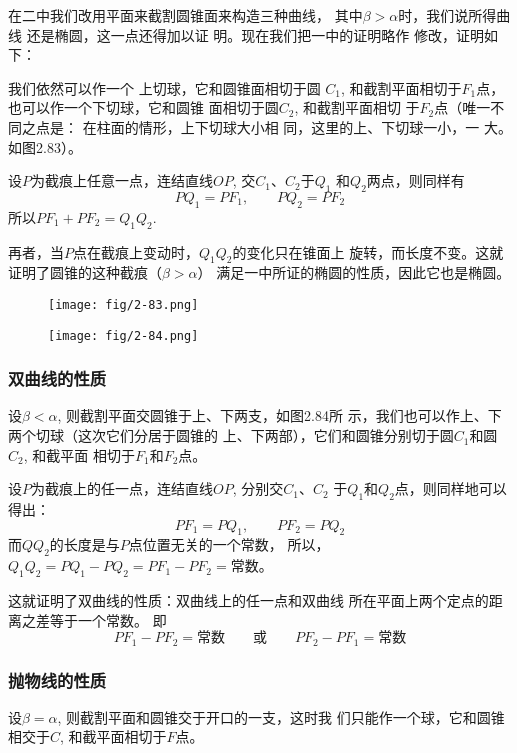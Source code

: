 在二中我们改用平面来截割圆锥面来构造三种曲线，
其中$\beta>\alpha$时，我们说所得曲线
还是椭圆，这一点还得加以证
明。现在我们把一中的证明略作
修改，证明如下：

我们依然可以作一个
上切球，它和圆锥面相切于圆
$C_1$, 和截割平面相切于$F_1$点，
也可以作一个下切球，它和圆锥
面相切于圆$C_2$, 和截割平面相切
于$F_2$点（唯一不同之点是：
在柱面的情形，上下切球大小相
同，这里的上、下切球一小，一
大。如图2.83）。

设$P$为截痕上任意一点，连结直线$OP$, 交$C_1$、$C_2$于$Q_1$
和$Q_2$两点，则同样有
\[PQ_1=PF_1,\qquad PQ_2=PF_2\]
所以$PF_1+PF_2=Q_1Q_2$.

再者，当$P$点在截痕上变动时，$Q_1Q_2$的变化只在锥面上
旋转，而长度不变。这就证明了圆锥的这种截痕（$\beta>\alpha$）
满足一中所证的椭圆的性质，因此它也是椭圆。

\begin{figure}[htp]\centering
    \begin{minipage}[t]{0.48\textwidth}
    \centering
\texttt{[image: fig/2-83.png]}
    \caption{}
    \end{minipage}
    \begin{minipage}[t]{0.48\textwidth}
    \centering
\texttt{[image: fig/2-84.png]}
    \caption{}
    \end{minipage}
    \end{figure}

\subsubsection{双曲线的性质}
设$\beta<\alpha$, 则截割平面交圆锥于上、下两支，如图2.84所
示，我们也可以作上、下两个切球（这次它们分居于圆锥的
上、下两部），它们和圆锥分别切于圆$C_1$和圆$C_2$, 和截平面
相切于$F_1$和$F_2$点。

设$P$为截痕上的任一点，连结直线$OP$, 分别交$C_1$、$C_2$
于$Q_1$和$Q_2$点，则同样地可以得出：
\[PF_1=PQ_1,\qquad PF_2=PQ_2\]
而$QQ_2$的长度是与$P$点位置无关的一个常数，
所以，$Q_1Q_2=PQ_1-PQ_2=PF_1-PF_2=$常数。

这就证明了双曲线的性质：双曲线上的任一点和双曲线
所在平面上两个定点的距离之差等于一个常数。
即
\[PF_1-PF_2=\text{常数}\qquad \text{或}\qquad PF_2-PF_1=\text{常数}\]


\subsubsection{抛物线的性质}
设$\beta=\alpha$, 则截割平面和圆锥交于开口的一支，这时我
们只能作一个球，它和圆锥相交于$C$, 和截平面相切于$F$点。

